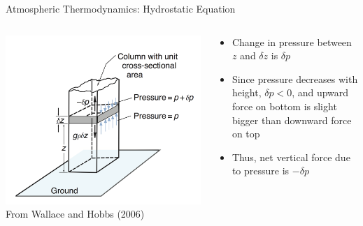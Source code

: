 \begin{frame}{Atmospheric Thermodynamics: Hydrostatic Equation}
\begin{columns}[T]
    \begin{column}{.5\textwidth}
    \begin{minipage}[c][0.8\textheight][c]{\linewidth}
    \includegraphics[width=1\textwidth]{fig1.png}\\
    \centering \small From Wallace and Hobbs (2006)
    \end{minipage}
    \end{column}
    \begin{column}{.5\textwidth}
    \begin{minipage}[c][0.8\textheight][c]{\linewidth}
   \begin{itemize}
   	\item Change in pressure between $z$ and $\delta z$ is $\delta p$
   	\item Since pressure decreases with height, $\delta p < 0$, and upward force on bottom is slight bigger than downward force on top
   	\item Thus, net vertical force due to pressure is $-\delta p$
   \end{itemize}
      \end{minipage}
    \end{column}
  \end{columns} 
\end{frame}

